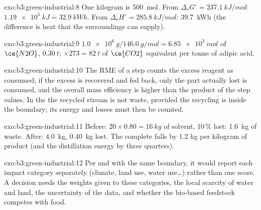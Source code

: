 \begin{solution}{exo:b3:green-industrial:8}
One kilogram is \qty{500}{mol}. From $\Delta_rG^\circ = \qty{237.1}{kJ/mol}$: $\qty{1.19e5}{kJ} = \qty{32.9}{kWh}$. From $\Delta_rH^\circ = \qty{285.8}{kJ/mol}$: \qty{39.7}{kWh}
(the difference is heat that the surroundings can supply).
\end{solution}

\begin{solution}{exo:b3:green-industrial:9}
$\qty{1.0e6}{g}/\qty{146.0}{g/mol} = \qty{6.85e3}{mol}$ of $\ce{N2O}$, $\qty{0.30}{t}$; $\times 273 = \qty{82}{t}$ of $\ce{CO2}$ equivalent per tonne of adipic acid.
\end{solution}

\begin{solution}{exo:b3:green-industrial:10}
The RME of a step counts the excess reagent as consumed; if the excess is recovered
and fed back, only the part actually lost is consumed, and the overall mass
efficiency is higher than the product of the step values. In the  the
recycled stream is not waste, provided the recycling is inside the boundary;
its energy and losses must then be counted.
\end{solution}

\begin{solution}{exo:b3:green-industrial:11}
Before: $20 \times 0.80 = \qty{16}{kg}$ of solvent, 10\,\% lost: \qty{1.6}{kg} of waste. After: \qty{4.0}{kg}, \qty{0.40}{kg} lost. The
complete  falls by 1.2 kg per kilogram of product (and the distillation
energy by three quarters).
\end{solution}

\begin{solution}{exo:b3:green-industrial:12}
Per  and with the same boundary, it would report each impact
category separately (climate, land use, water use\dots) rather than one score. A
decision needs the weights given to these categories, the local scarcity of water
and land, the uncertainty of the data, and whether the bio-based feedstock
competes with food.
\end{solution}

